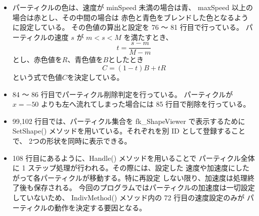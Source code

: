 \begin{itemize}
 \item パーティクルの色は、速度が minSpeed 未満の場合は青、
	maxSpeed 以上の場合は赤とし、その中間の場合は
	赤色と青色をブレンドした色となるように設定している。
	その色値の算出と設定を 76 〜 81 行目で行っている。
	パーティクルの速度 \(s\) が \(m < s < M\) を満たすとき、
	\begin{equation}
		t = \frac{s - m}{M - m}
	\end{equation}
	とし、赤色値を\(R\)、青色値を\(B\)としたとき
	\begin{equation}
		 C = (1-t)B + tR
	\end{equation}
	という式で色値\(C\)を決定している。

 \item 84 〜 86 行目でパーティクル削除判定を行っている。
	パーティクルが \(x = -50\) よりも左へ流れてしまった場合には
	85 行目で削除を行っている。

 \item 99,102 行目では、パーティクル集合を fk\_ShapeViewer で表示するために
	SetShape() メソッドを用いている。それぞれを別 ID として登録することで、
	2つの形状を同時に表示できる。

 \item 108 行目にあるように、Handle() メソッドを用いることで
	パーティクル全体に 1 ステップ処理が行われる。その際には、設定した
	速度や加速度にしたがって各パーティクルが移動する。特に再設定
	しない限り、加速度は処理終了後も保存される。
	今回のプログラムではパーティクルの加速度は一切設定していないため、
	IndivMethod() メソッド内の 72 行目の速度設定のみが
	パーティクルの動作を決定する要因となる。

\end{itemize}



